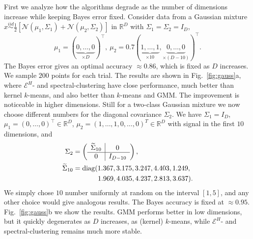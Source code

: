 \documentclass[twoside]{article}
\DeclareMathOperator{\diag}{diag}
\begin{document}
First we analyze
how the algorithms degrade as the number of dimensions increase while
keeping Bayes error fixed.
Consider data from a Gaussian mixture
$x  \stackrel{iid}{\sim} 
\tfrac{1}{2}\left[\mathcal{N}(\mu_1,\Sigma_1) +
\mathcal{N}(\mu_2,\Sigma_2)\right]$ in $\mathbb{R}^D$ with
$\Sigma_1=\Sigma_2 = I_D$,   
\begin{equation}
\label{eq:gauss1}
\mu_1 = (\underbrace{0,\dotsc,0}_{\times D})^\top, \
\mu_2 = 0.7 (\underbrace{1,\dots,1}_{\times 10},
\underbrace{0,\dots,0}_{\times (D-10)})^\top.
\end{equation}
The Bayes error gives an optimal accuracy
$\approx 0.86$, which is fixed as $D$ increases.
We sample $200$ points for each trial.
The results are shown in Fig.~\ref{fig:gauss}a, where
$\mathcal{E}^H$- and spectral-clustering have close
performance,  
much better than kernel $k$-means, and also 
better than 
$k$-means and GMM. The improvement is noticeable in 
higher dimensions.
Still for a two-class Gaussian mixture we now choose
different numbers for the  diagonal covariance $\Sigma_2$.
We have $\Sigma_1=I_D$, $\mu_1=(0,\dotsc,0)^\top \in \mathbb{R}^D$,
$\mu_2=(1,\dotsc,1,0,\dotsc,0)^T \in \mathbb{R}^D$ 
with signal in the first $10$ dimensions, and
\begin{equation}
\label{eq:gauss2}
\begin{split}
\Sigma_2 &= \left( \begin{array}{c|c}
\widetilde{\Sigma}_{10} & 0 \\ \hline 
0 & I_{D-10} \end{array}\right), \\
\widetilde{\Sigma}_{10} &= \diag(1.367,  3.175,  3.247,  4.403,  1.249,\\
&\hspace{3.6em}1.969, 4.035,   4.237,  2.813,  3.637).
\end{split}
\end{equation}
We simply chose $10$ number uniformly at random on the interval
$[1,5]$, and any other choice would give analogous results.
The Bayes  accuracy is fixed at $\approx 0.95$.
Fig.~\ref{fig:gauss}b we show the results. 
GMM performs better in low dimensions, 
but it quickly degenerates
as $D$ increases, as (kernel) $k$-means, while  
$\mathcal{E}^H$- and spectral-clustering remains much more stable. 
\end{document}

